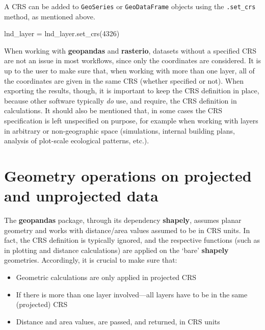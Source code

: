 \documentclass[
  letterpaper,
]{krantz}
\newenvironment{Shaded}{\begin{snugshade}}{\end{snugshade}}
\newcommand{\DecValTok}[1]{\textcolor[rgb]{0.68,0.00,0.00}{#1}}
\newcommand{\NormalTok}[1]{\textcolor[rgb]{0.00,0.23,0.31}{#1}}
\newcommand{\OperatorTok}[1]{\textcolor[rgb]{0.37,0.37,0.37}{#1}}
\providecommand{\tightlist}{%
  \setlength{\itemsep}{0pt}\setlength{\parskip}{0pt}}\usepackage{longtable,booktabs,array}
\begin{document}
A CRS can be added to \texttt{GeoSeries} or \texttt{GeoDataFrame}
objects using the \texttt{.set\_crs} method, as mentioned above.

\begin{Shaded}
\begin{Highlighting}[]
\NormalTok{lnd\_layer }\OperatorTok{=}\NormalTok{ lnd\_layer.set\_crs(}\DecValTok{4326}\NormalTok{)}
\end{Highlighting}
\end{Shaded}

When working with \textbf{geopandas} and \textbf{rasterio}, datasets
without a specified CRS are not an issue in most workflows, since only
the coordinates are considered. It is up to the user to make sure that,
when working with more than one layer, all of the coordinates are given
in the same CRS (whether specified or not). When exporting the results,
though, it is important to keep the CRS definition in place, because
other software typically \emph{do} use, and require, the CRS definition
in calculations. It should also be mentioned that, in some cases the CRS
specification is left unspecified on purpose, for example when working
with layers in arbitrary or non-geographic space (simulations, internal
building plans, analysis of plot-scale ecological patterns, etc.).

\section{Geometry operations on projected and unprojected
data}\label{sec-geometry-operations-on-projected-and-unprojected-data}

The \textbf{geopandas} package, through its dependency \textbf{shapely},
assumes planar geometry and works with distance/area values assumed to
be in CRS units. In fact, the CRS definition is typically ignored, and
the respective functions (such as in plotting and distance calculations)
are applied on the `bare' \textbf{shapely} geometries. Accordingly, it
is crucial to make sure that:

\begin{itemize}
\tightlist
\item
  Geometric calculations are only applied in projected CRS
\item
  If there is more than one layer involved---all layers have to be in
  the same (projected) CRS
\item
  Distance and area values, are passed, and returned, in CRS units
\end{itemize}
\end{document}
